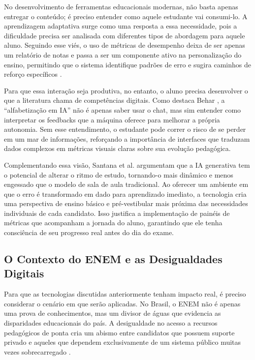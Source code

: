 \documentclass[12pt]{article}
\begin{document}
No desenvolvimento de ferramentas educacionais modernas, não basta apenas entregar o conteúdo; é preciso entender como aquele estudante vai consumi-lo. A aprendizagem adaptativa surge como uma resposta a essa necessidade, pois a dificuldade precisa ser analisada com diferentes tipos de abordagem para aquele aluno. Seguindo esse viés, o uso de métricas de desempenho deixa de ser apenas um relatório de notas e passa a ser um componente ativo na personalização do ensino, permitindo que o sistema identifique padrões de erro e sugira caminhos de reforço específicos \cite{behar2023}.

Para que essa interação seja produtiva, no entanto, o aluno precisa desenvolver o que a literatura chama de competências digitais. Como destaca Behar \cite{behar2023}, a ``alfabetização em IA'' não é apenas saber usar o chat, mas sim entender como interpretar os feedbacks que a máquina oferece para melhorar a própria autonomia. Sem esse entendimento, o estudante pode correr o risco de se perder em um mar de informações, reforçando a importância de interfaces que traduzam dados complexos em métricas visuais claras sobre sua evolução pedagógica.

Complementando essa visão, Santana et al. \cite{santana2024} argumentam que a IA generativa tem o potencial de alterar o ritmo de estudo, tornando-o mais dinâmico e menos engessado que o modelo de sala de aula tradicional. Ao oferecer um ambiente em que o erro é transformado em dado para aprendizado imediato, a tecnologia cria uma perspectiva de ensino básico e pré-vestibular mais próxima das necessidades individuais de cada candidato. Isso justifica a implementação de painéis de métricas que acompanham a jornada do aluno, garantindo que ele tenha consciência de seu progresso real antes do dia do exame.

\subsection{O Contexto do ENEM e as Desigualdades Digitais}

Para que as tecnologias discutidas anteriormente tenham impacto real, é preciso considerar o cenário em que serão aplicadas. No Brasil, o ENEM não é apenas uma prova de conhecimentos, mas um divisor de águas que evidencia as disparidades educacionais do país. A desigualdade no acesso a recursos pedagógicos de ponta cria um abismo entre candidatos que possuem suporte privado e aqueles que dependem exclusivamente de um sistema público muitas vezes sobrecarregado \cite{latitude2023}.
\end{document}
